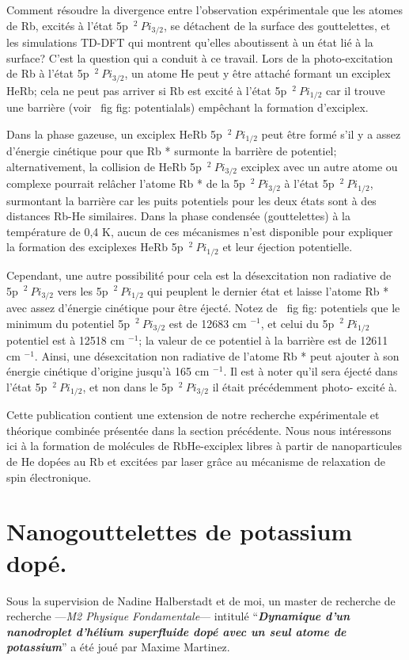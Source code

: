		Comment résoudre la divergence entre l'observation expérimentale que les atomes de Rb, excités à l'état 5p $ \, ^ 2 \ Pi_ {3/2} $, se détachent de la surface des gouttelettes, et les simulations TD-DFT qui montrent qu'elles aboutissent à un état lié à la surface? C'est la question qui a conduit à ce travail. Lors de la photo-excitation de Rb à l'état 5p $ \, ^ 2 \ Pi_ {3/2} $, un atome He peut y être attaché formant un exciplex HeRb; cela ne peut pas arriver si Rb est excité à l'état 5p $ \, ^ 2 \ Pi_ {1/2} $ car il trouve une barrière (voir \ fig {fig: potentialals}) empêchant la formation d'exciplex.
		
		Dans la phase gazeuse, un exciplex HeRb 5p $ \, ^ 2 \ Pi_ {1/2} $ peut être formé s'il y a assez d'énergie cinétique pour que Rb * surmonte la barrière de potentiel; alternativement, la collision de HeRb 5p $ \, ^ 2 \ Pi_ {3/2} $ exciplex avec un autre atome ou complexe pourrait relâcher l'atome Rb * de la 5p $ \, ^ 2 \ Pi_ {3/2} $ à l'état 5p $ \, ^ 2 \ Pi_ {1/2} $, surmontant la barrière car les puits potentiels pour les deux états sont à des distances Rb-He similaires. Dans la phase condensée (gouttelettes) à la température de 0,4 K, aucun de ces mécanismes n'est disponible pour expliquer la formation des exciplexes HeRb 5p $ \, ^ 2 \ Pi_ {1/2} $ et leur éjection potentielle.
		
		Cependant, une autre possibilité pour cela est la désexcitation non radiative de 5p $ \, ^ 2 \ Pi_ {3/2} $ vers les 5p $ \, ^ 2 \ Pi_ {1/2} $ qui peuplent le dernier état et laisse l'atome Rb * avec assez d'énergie cinétique pour être éjecté. Notez de \ fig {fig: potentiels} que le minimum du potentiel 5p $ \, ^ 2 \ Pi_ {3/2} $ est de 12683 cm $ ^ {- 1} $, et celui du 5p $ \, ^ 2 \ Pi_ {1/2} $ potentiel est à 12518 cm $ ^ {- 1} $; la valeur de ce potentiel à la barrière est de 12611 cm $ ^ {- 1} $. Ainsi, une désexcitation non radiative de l'atome Rb * peut ajouter à son énergie cinétique d'origine jusqu'à 165 cm $ ^ {- 1} $. Il est à noter qu'il sera éjecté dans l'état 5p $ \, ^ 2 \ Pi_ {1/2} $, et non dans le 5p $ \, ^ 2 \ Pi_ {3/2} $ il était précédemment photo- excité à.
		
		Cette publication contient une extension de notre recherche expérimentale et théorique combinée présentée dans la section précédente. Nous nous intéressons ici à la formation de molécules de RbHe-exciplex libres à partir de nanoparticules de He dopées au Rb et excitées par laser grâce au mécanisme de relaxation de spin électronique.		

	\section*{Nanogouttelettes de potassium dopé.}
		Sous la supervision de Nadine Halberstadt et de moi, un master de recherche de recherche ---\emph{M2 Physique Fondamentale}--- intitulé ``\emph{\textbf{Dynamique d'un nanodroplet d'hélium superfluide dopé avec un seul atome de potassium}}'' a été joué par Maxime Martinez.
		
